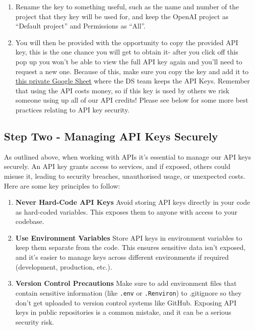 \documentclass[
  letterpaper,
  DIV=11,
  numbers=noendperiod]{scrreprt}
\begin{document}
\begin{enumerate}
\def\labelenumi{\arabic{enumi}.}
\setcounter{enumi}{3}
\item
  Rename the key to something useful, such as the name and number of the
  project that they key will be used for, and keep the OpenAI project as
  ``Default project'' and Permissions as ``All''.
\item
  You will then be provided with the opportunity to copy the provided
  API key, this is the one chance you will get to obtain it- after you
  click off this pop up you won't be able to view the full API key again
  and you'll need to request a new one. Because of this, make sure you
  copy the key and add it to
  \href{https://docs.google.com/spreadsheets/d/1thkNcaVC_12MpSRl2LB_nmj1AHZrU_AzrXYwfOfMC7w/edit?usp=sharing}{this
  private Google Sheet} where the DS team keeps the API Keys. Remember
  that using the API costs money, so if this key is used by others we
  risk someone using up all of our API credits! Please see below for
  some more best practices relating to API key security.
\end{enumerate}

\subsection{Step Two - Managing API Keys
Securely}\label{step-two---managing-api-keys-securely}

As outlined above, when working with APIs it's essential to manage our
API keys securely. An API key grants access to services, and if exposed,
others could misuse it, leading to security breaches, unauthorised
usage, or unexpected costs. Here are some key principles to follow:

\begin{enumerate}
\def\labelenumi{\arabic{enumi}.}
\item
  \textbf{Never Hard-Code API Keys} Avoid storing API keys directly in
  your code as hard-coded variables. This exposes them to anyone with
  access to your codebase.
\item
  \textbf{Use Environment Variables} Store API keys in environment
  variables to keep them separate from the code. This ensures sensitive
  data isn't exposed, and it's easier to manage keys across different
  environments if required (development, production, etc.).
\item
  \textbf{Version Control Precautions} Make sure to add environment
  files that contain sensitive information (like \texttt{.env} or
  \texttt{.Renviron}) to .gitignore so they don't get uploaded to
  version control systems like GitHub. Exposing API keys in public
  repositories is a common mistake, and it can be a serious security
  risk.
\end{enumerate}
\end{document}
